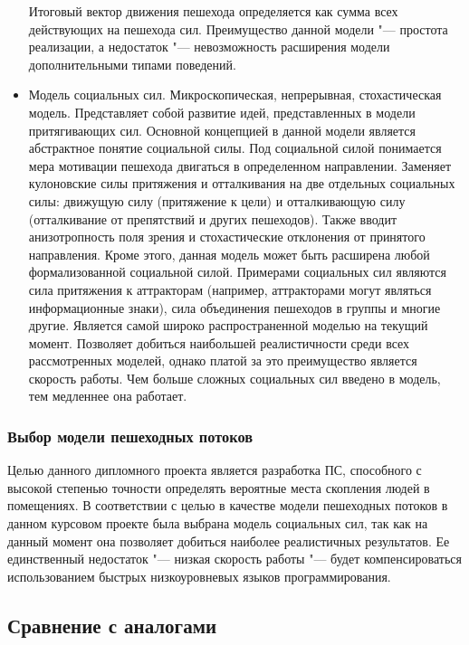 \begin{itemize}
        Итоговый вектор движения пешехода определяется как сумма всех действующих на пешехода сил.
        Преимущество данной модели "--- простота реализации, а недостаток "--- невозможность расширения модели дополнительными типами поведений.
  \item Модель социальных сил.
        Микроскопическая, непрерывная, стохастическая модель.
        Представляет собой развитие идей, представленных в модели притягивающих сил.
        Основной концепцией в данной модели является абстрактное понятие социальной силы. Под социальной силой понимается мера мотивации пешехода двигаться в определенном направлении.
        Заменяет кулоновские силы притяжения и отталкивания на две отдельных социальных силы: движущую силу (притяжение к цели) и отталкивающую силу (отталкивание от препятствий и других пешеходов).
        Также вводит анизотропность поля зрения и стохастические отклонения от принятого направления.
        Кроме этого, данная модель может быть расширена любой формализованной социальной силой.
        Примерами социальных сил являются сила притяжения к аттракторам (например, аттракторами могут являться информационные знаки), сила объединения пешеходов в группы и многие другие.
        Является самой широко распространенной моделью на текущий момент.
        Позволяет добиться наибольшей реалистичности среди всех рассмотренных моделей, однако платой за это преимущество является скорость работы.
        Чем больше сложных социальных сил введено в модель, тем медленнее она работает.
\end{itemize}

\subsubsection{Выбор модели пешеходных потоков}
\label{sub:domain:models:choice}

Целью данного дипломного проекта является разработка ПС, способного с высокой степенью точности определять вероятные места скопления людей в помещениях.
В соответствии с целью в качестве модели пешеходных потоков в данном курсовом проекте была выбрана модель социальных сил,
так как на данный момент она позволяет добиться наиболее реалистичных результатов.
Ее единственный недостаток "--- низкая скорость работы "--- будет компенсироваться использованием быстрых низкоуровневых языков программирования.

\subsection{Сравнение с аналогами}
\label{sub:domain:analogs}

